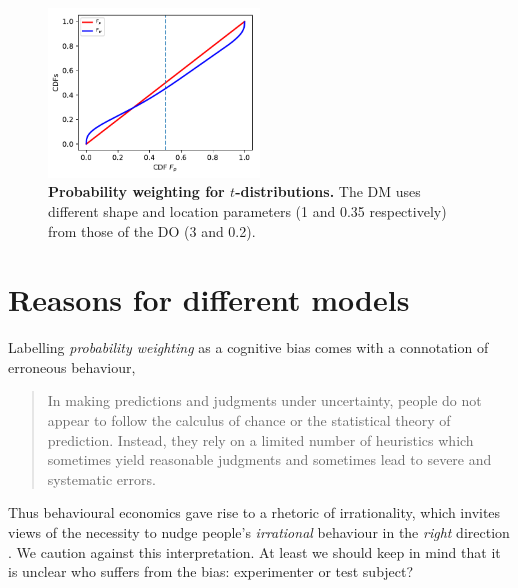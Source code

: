 \documentclass[a4paper, 12pt]{article}
\newcommand{\flabel}[1]{\label{fig:#1}}
\newcommand{\seclabel}[1]{\label{sec:#1}}
\newcommand{\ND}{\mathcal{N}} %
\begin{document}
\begin{figure}[htb]
\centering
\includegraphics[width=0.5\textwidth]{./figs/Student-t.pdf}
\caption{{\bf Probability weighting for $t$-distributions.} The DM uses different shape and location parameters (1 and 0.35 respectively) from those of the DO (3 and 0.2).}
\flabel{Student-t}
\end{figure}



\FloatBarrier

\section{Reasons for different models\seclabel{Reasons_for}}
Labelling \textit{probability weighting} as a cognitive bias comes with a connotation of erroneous behaviour,
\blockquote[{\cite[p. 237]{KahnemanTversky1973}}]{In making predictions and judgments under uncertainty, people do not appear to follow the calculus of chance or the statistical theory of prediction. Instead, they rely on a limited number of heuristics which sometimes yield reasonable judgments and sometimes lead to severe and systematic errors.}
%
Thus behavioural economics gave rise to a rhetoric of irrationality, which invites views of the necessity to nudge people's \textit{irrational} behaviour in the \textit{right} direction \citep{Lopes1991,Gigerenzer2018}. We caution against this interpretation. At least we should keep in mind that it is unclear who suffers from the bias: experimenter or test subject? \citep{Cohen1979a}
\end{document}
